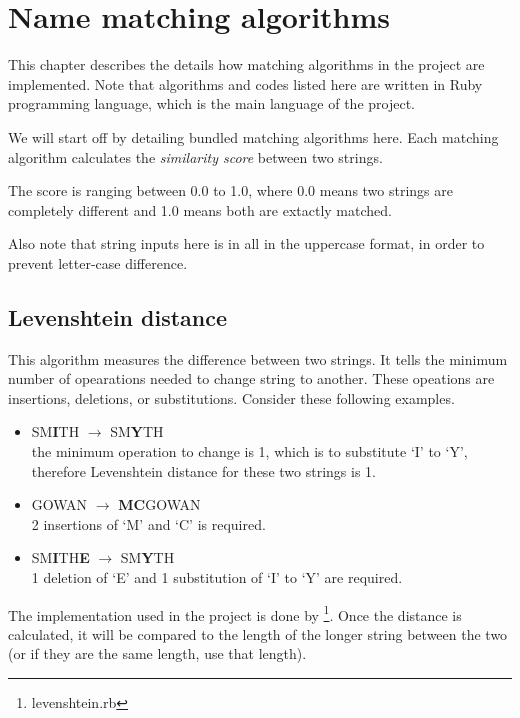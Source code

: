 \chapter{Name matching algorithms}
\label{ch:nma}

This chapter describes the details how matching algorithms
in the project are implemented.
Note that algorithms and codes listed here are written in Ruby programming language,
which is the main language of the project.

We will start off by detailing bundled matching algorithms here.
Each matching algorithm calculates the \emph{similarity score} between
two strings.

The score is ranging between 0.0 to 1.0, where 0.0 means
two strings are completely different and 1.0 means both are extactly matched.

Also note that string inputs here is in all in the uppercase format,
in order to prevent letter-case difference.

\section{Levenshtein distance}
\label{sec:leven}

This algorithm measures the difference between two strings.
It tells the minimum number of opearations needed to change string to
another. These opeations are insertions, deletions, or substitutions.
Consider these following examples.

\begin{itemize}
  \item SM\textbf{I}TH $\rightarrow$ SM\textbf{Y}TH \\
    the minimum operation to change is 1, which is to substitute `I' to
    `Y', therefore Levenshtein distance for these two strings is 1.
  \item GOWAN $\rightarrow$ \textbf{MC}GOWAN \\
    2 insertions of `M' and `C' is required.
  \item SM\textbf{I}TH\textbf{E} $\rightarrow$ SM\textbf{Y}TH \\
    1 deletion of `E' and 1 substitution of `I' to `Y' are required.
\end{itemize}

The implementation used in the project is done by \citet{textgem}\footnote{levenshtein.rb}.
Once the distance is calculated, it will be compared to the length of
the longer string between the two (or if they are the same length,
use that length).


